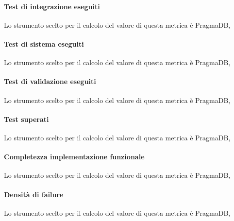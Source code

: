 \paragraph{Test di integrazione eseguiti}
Lo strumento scelto per il calcolo del valore di questa metrica è PragmaDB,
\paragraph{Test di sistema eseguiti}
Lo strumento scelto per il calcolo del valore di questa metrica è PragmaDB,
\paragraph{Test di validazione eseguiti}
Lo strumento scelto per il calcolo del valore di questa metrica è PragmaDB,
\paragraph{Test superati}
Lo strumento scelto per il calcolo del valore di questa metrica è PragmaDB,
\paragraph{Completezza implementazione funzionale}
Lo strumento scelto per il calcolo del valore di questa metrica è PragmaDB,
\paragraph{Densità di failure}
Lo strumento scelto per il calcolo del valore di questa metrica è PragmaDB,